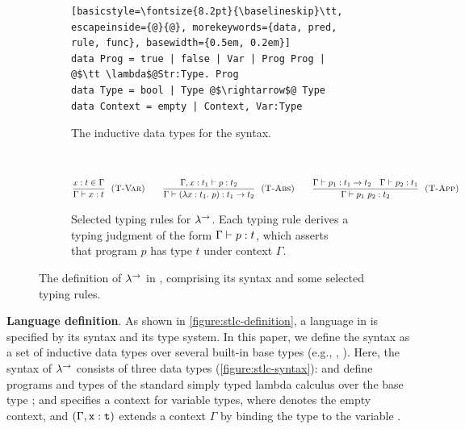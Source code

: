 \begin{figure}[t]
\hfill
\begin{subfigure}{0.65\textwidth}
\begin{lstlisting}[basicstyle=\fontsize{8.2pt}{\baselineskip}\tt, escapeinside={@}{@}, morekeywords={data, pred, rule, func}, basewidth={0.5em, 0.2em}] 
data Prog = true | false | Var | Prog Prog | @$\tt \lambda$@Str:Type. Prog
data Type = bool | Type @$\rightarrow$@ Type      
data Context = empty | Context, Var:Type
\end{lstlisting}
\vspace{-0.5em}
\caption{The inductive data types for the syntax.} \label{figure:stlc-syntax}
\end{subfigure}
\hfill\ 

\vspace{1em}

\begin{subfigure}{0.8\textwidth}
\small

\begin{gather*}
\frac{{x}:{t} \in {\Gamma}}{{\Gamma} \vdash {\ensuremath{{x}}} : {t}} \ \ \textsc{(T-Var)} \qquad
\frac{{{\Gamma}, {x}:{t_1}} \vdash {p} : {t_2}}{{\Gamma} \vdash {\left(\ensuremath{\lambda {x}:{t_1}.\ {p}}\right)} : {{t_1}\rightarrow { t_2}}} \ \ \textsc{(T-Abs)} \qquad
\frac{{\Gamma} \vdash {p_1} : {{t_1}\rightarrow {t_2}} \quad {\Gamma} \vdash {p_2} : {t_1}}{{\Gamma} \vdash {\ensuremath{{p_1}\ {p_2}}} : {t_2}} \ \ \textsc{(T-App)} \qquad
\end{gather*}
\vspace{-0.5em}
\caption{Selected typing rules for $\lambda^{\rightarrow}$. Each typing rule derives a typing judgment of the form ${\Gamma} \vdash {p} : {t}$, which asserts that program $p$ has type $t$ under context $\Gamma$.} 
    \label{figure:stlc-rules}
\end{subfigure}
\vspace{-0.5em}
\caption{The definition of $\lambda^{\rightarrow}$ in \mainname, comprising its syntax and some selected typing rules.
}
\label{figure:stlc-definition}
\end{figure}

\smallskip 
\noindent \textbf{Language definition}. As shown in \autoref{figure:stlc-definition}, a language in \mainname is specified by its syntax and its type system.
%
In this paper, we define the syntax as a set of inductive data types over several built-in base types (e.g., , ). 
Here, the syntax of $\lambda^{\rightarrow}$ consists of three data types (\autoref{figure:stlc-syntax}):
 and  define programs and types of the standard simply typed lambda calculus over the base type ; and 
 specifies a context for variable types, where  denotes the empty context, and ${({\Gamma}, {\tt x}:{\tt t})}$ extends a context $\Gamma$ by binding the type  to the variable .

